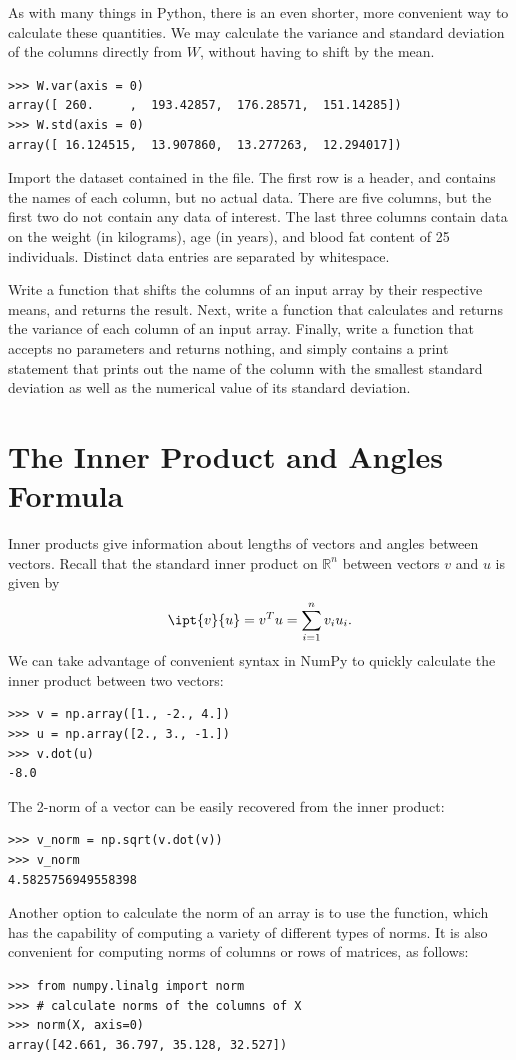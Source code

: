 As with many things in Python, there is an even shorter, more convenient way to calculate these quantities.
We may calculate the variance and standard deviation of the columns directly from $W$, without having to shift
by the mean.
\begin{lstlisting}
>>> W.var(axis = 0)
array([ 260.     ,  193.42857,  176.28571,  151.14285])
>>> W.std(axis = 0)
array([ 16.124515,  13.907860,  13.277263,  12.294017])
\end{lstlisting}

\begin{problem}
\label{prob:shiftdata}
Import the dataset contained in the  file. The first row is a header, and contains the names
of each column, but no actual data. There are five columns, but the first two do not contain any data of interest.
The last three columns contain data on the weight (in kilograms), age (in years), and blood fat content of 25
individuals. Distinct data entries are separated by whitespace.

Write a function  that shifts the columns of an input array by their respective means, and returns the result.
Next, write a function  that calculates and returns the variance of each column of an input array.
Finally, write a function  that accepts no parameters and returns nothing, and simply contains a print
statement that prints out the name of the column with the smallest standard deviation as well as the numerical value of
its standard deviation.

\end{problem}

\section*{The Inner Product and Angles Formula}

Inner products give information about lengths of vectors and angles between vectors.
Recall that the standard inner product on $\mathbb{R}^n$ between vectors $v$ and $u$ is given by
\[
\ipt{v}{u} = v^T u = \displaystyle\sum_{i=1}^n v_iu_i.
\]
We can take advantage of convenient syntax in NumPy to quickly calculate the inner product between two vectors:
\begin{lstlisting}
>>> v = np.array([1., -2., 4.])
>>> u = np.array([2., 3., -1.])
>>> v.dot(u)
-8.0
\end{lstlisting}
The 2-norm of a vector can be easily recovered from the inner product:
\begin{lstlisting}
>>> v_norm = np.sqrt(v.dot(v))
>>> v_norm
4.5825756949558398
\end{lstlisting}
Another option to calculate the norm of an array is to use the  function, which has the
capability of computing a variety of different types of norms. 
It is also convenient for computing norms of columns or rows of matrices, as follows:
\begin{lstlisting}
>>> from numpy.linalg import norm
>>> # calculate norms of the columns of X
>>> norm(X, axis=0)
array([42.661, 36.797, 35.128, 32.527])
\end{lstlisting}


